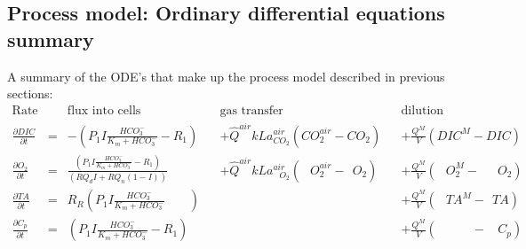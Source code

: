 \documentclass{ruthesis}
\begin{document}
\subsection{Process model: Ordinary differential equations summary}\label{sec:micro_process_model}

A summary of the ODE's that make up the process model described in previous sections:
\begin{align}
\text{Rate} & & \text{flux into cells}            &            &\text{gas transfer}   &     & \text{dilution} \nonumber                              \\
\frac{\partial DIC}{\partial t}&=&                      - (P_1 I \frac{HCO_3^-}{K_m + HCO_3^-} - R_1)&      &+\hat Q^{air}kLa_{ CO_2}^{air}(CO_{2}^{air} - CO_{2})                  & &+\frac{Q^M}{V}(DIC^{M} - DIC)       \nonumber \\
\frac{\partial O_2}{\partial t}&=& \frac{(P_1 I \frac{HCO_3^-}{K_m + HCO_3^-} - R_1)}{(RQ_d I + RQ_n(1-I))}  &      &+\hat Q^{air}kLa_{\phantom{C}O_2}^{air}(\phantom{C}O_{2}^{air} - \phantom{I}O_{2}) && +\frac{Q^M}{V}(\phantom{C}O_{2}^{M} - \phantom{CC}O_{2})     \nonumber   \\
\frac{\partial TA}{\partial t} & =&      R_R (P_1 I \frac{HCO_3^-}{K_m + HCO_3^-} \phantom{ + R_1})& & & & +\frac{Q^M}{V}(\phantom{C}TA^{M} - \phantom{I}TA) \nonumber\\
\frac{\partial C_p}{\partial t} & =& (P_1 I \frac{HCO_3^-}{K_m + HCO_3^-} - R_1)&  & & & +\frac{Q^M}{V}(\phantom{CTA^{M}} - \phantom{II}C_p) 
\end{align}
\end{document}
